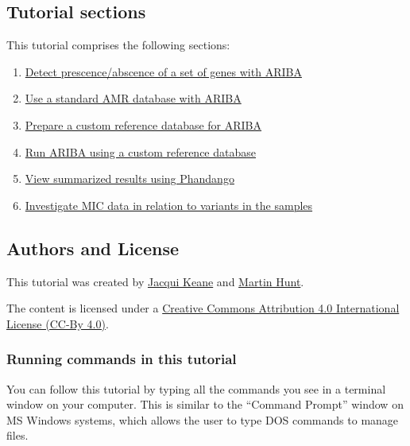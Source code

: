 \documentclass[11pt]{article}
\providecommand{\tightlist}{%
      \setlength{\itemsep}{0pt}\setlength{\parskip}{0pt}}
\begin{document}
\hypertarget{tutorial-sections}{%
\subsection{Tutorial sections}\label{tutorial-sections}}

This tutorial comprises the following sections:

\begin{enumerate}
\def\labelenumi{\arabic{enumi}.}
\tightlist
\item
  \href{basic_ariba.ipynb}{Detect prescence/abscence of a set of genes
  with ARIBA}
\item
  \href{standard_ariba.ipynb}{Use a standard AMR database with ARIBA}
\item
  \href{make_custom_db.ipynb}{Prepare a custom reference database for
  ARIBA}
\item
  \href{run_ariba.ipynb}{Run ARIBA using a custom reference database}
\item
  \href{phandango.ipynb}{View summarized results using Phandango}
\item
  \href{micplot.ipynb}{Investigate MIC data in relation to variants in
  the samples}
\end{enumerate}

\hypertarget{authors-and-license}{%
\subsection{Authors and License}\label{authors-and-license}}

This tutorial was created by
\href{https://github.com/jacquikeane}{Jacqui Keane} and
\href{https://github.com/martinghunt}{Martin Hunt}.

The content is licensed under a
\href{https://creativecommons.org/licenses/by/4.0/}{Creative Commons
Attribution 4.0 International License (CC-By 4.0)}.

    \hypertarget{running-commands-in-this-tutorial}{%
\subsubsection{Running commands in this
tutorial}\label{running-commands-in-this-tutorial}}

You can follow this tutorial by typing all the commands you see in a
terminal window on your computer. This is similar to the ``Command
Prompt'' window on MS Windows systems, which allows the user to type DOS
commands to manage files.
\end{document}

